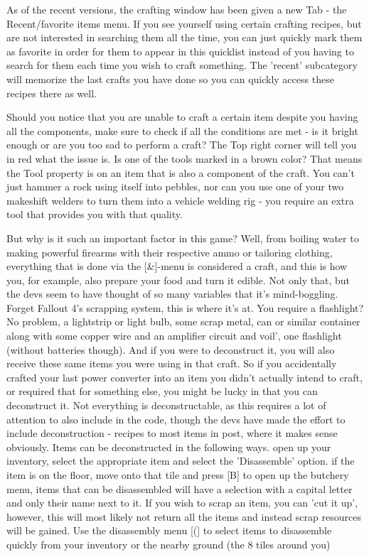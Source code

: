 \documentclass[11pt]{report}
\begin{document}
As of the recent versions, the crafting window has been given a new Tab - the Recent/favorite items menu. If you see yourself using certain crafting recipes, but are not interested in searching them all the time, you can just quickly mark them as favorite in order for them to appear in this quicklist instead of you having to search for them each time you wish to craft something. The 'recent' subcategory will memorize the last crafts you have done so you can quickly access these recipes there as well.

Should you notice that you are unable to craft a certain item despite you having all the components, make sure to check if all the conditions are met - is it bright enough or are you too sad to perform a craft? The Top right corner will tell you in red what the issue is. Is one of the tools marked in a brown color? That means the Tool property is on an item that is also a component of the craft. You can't just hammer a rock using itself into pebbles, nor can you use one of your two makeshift welders to turn them into a vehicle welding rig - you require an extra tool that provides you with that quality.

But why is it such an important factor in this game? Well, from boiling water to making powerful firearms with their respective ammo or tailoring clothing, everything that is done via the [\&]-menu is considered a craft, and this is how you, for example, also prepare your food and turn it edible. Not only that, but the devs seem to have thought of so many variables that it's mind-boggling. Forget Fallout 4's scrapping system, this is where it's at. You require a flashlight? No problem, a lightstrip or light bulb, some scrap metal, can or similar container along with some copper wire and an amplifier circuit and voil', one flashlight (without batteries though). And if you were to deconstruct it, you will also receive these same items you were using in that craft. So if you accidentally crafted your last power converter into an item you didn't actually intend to craft, or required that for something else, you might be lucky in that you can deconstruct it. Not everything is deconstructable, as this requires a lot of attention to also include in the code, though the devs have made the effort to include deconstruction - recipes to most items in post, where it makes sense obviously. Items can be deconstructed in the following ways.
open up your inventory, select the appropriate item and select the 'Disassemble' option.
if the item is on the floor, move onto that tile and press [B] to open up the butchery menu, items that can be disassembled will have a selection with a capital letter and only their name next to it. If you wish to scrap an item, you can 'cut it up', however, this will most likely not return all the items and instead scrap resources will be gained.
Use the disassembly menu [(] to select items to disassemble quickly from your inventory or the nearby ground (the 8 tiles around you)
\end{document}
